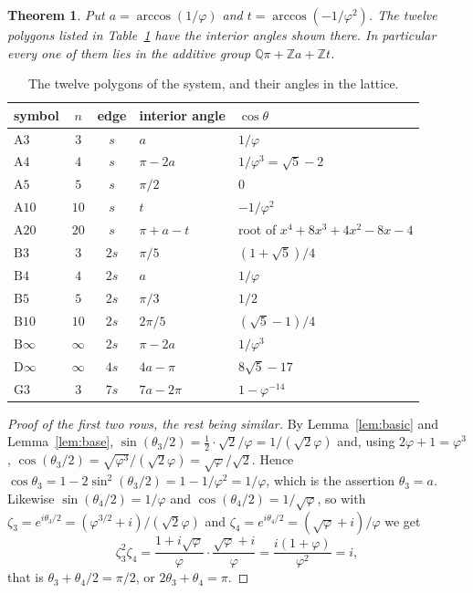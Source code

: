 \documentclass[11pt,a4paper]{article}
\theoremstyle{plain}
\newtheorem{theorem}{Theorem}[section]
\theoremstyle{definition}
\theoremstyle{remark}
\newcommand{\ZZ}{\mathbb{Z}}
\newcommand{\QQ}{\mathbb{Q}}
\begin{document}
\begin{theorem}\label{thm:lattice}
Put $a=\arccos(1/\varphi)$ and $t=\arccos(-1/\varphi^{2})$. The twelve polygons
listed in Table~\ref{tab:poly} have the interior angles shown there. In
particular every one of them lies in the additive group
$\QQ\pi+\ZZ a+\ZZ t$.
\end{theorem}

\begin{table}[t]
\centering
\begin{tabular}{@{}lccll@{}}
\toprule
symbol & $n$ & edge & interior angle & $\cos\theta$\\
\midrule
$\mathrm{A}3$   & $3$      & $s$  & $a$            & $1/\varphi$\\
$\mathrm{A}4$   & $4$      & $s$  & $\pi-2a$       & $1/\varphi^{3}=\sqrt5-2$\\
$\mathrm{A}5$   & $5$      & $s$  & $\pi/2$        & $0$\\
$\mathrm{A}10$  & $10$     & $s$  & $t$            & $-1/\varphi^{2}$\\
$\mathrm{A}20$  & $20$     & $s$  & $\pi+a-t$      & root of $x^{4}+8x^{3}+4x^{2}-8x-4$\\
$\mathrm{B}3$   & $3$      & $2s$ & $\pi/5$        & $(1+\sqrt5)/4$\\
$\mathrm{B}4$   & $4$      & $2s$ & $a$            & $1/\varphi$\\
$\mathrm{B}5$   & $5$      & $2s$ & $\pi/3$        & $1/2$\\
$\mathrm{B}10$  & $10$     & $2s$ & $2\pi/5$       & $(\sqrt5-1)/4$\\
$\mathrm{B}\infty$ & $\infty$ & $2s$ & $\pi-2a$    & $1/\varphi^{3}$\\
$\mathrm{D}\infty$ & $\infty$ & $4s$ & $4a-\pi$    & $8\sqrt5-17$\\
$\mathrm{G}3$   & $3$      & $7s$ & $7a-2\pi$      & $1-\varphi^{-14}$\\
\bottomrule
\end{tabular}
\caption{The twelve polygons of the system, and their angles in the lattice.}
\label{tab:poly}
\end{table}

\begin{proof}[Proof of the first two rows, the rest being similar]
By Lemma~\ref{lem:basic} and Lemma~\ref{lem:base},
$\sin(\theta_3/2)=\tfrac12\cdot\sqrt2/\varphi=1/(\sqrt2\varphi)$ and, using
$2\varphi+1=\varphi^{3}$,
$\cos(\theta_3/2)=\sqrt{\varphi^{3}}/(\sqrt2\varphi)=\sqrt{\varphi}/\sqrt2$.
Hence $\cos\theta_3=1-2\sin^{2}(\theta_3/2)=1-1/\varphi^{2}=1/\varphi$, which is
the assertion $\theta_3=a$. Likewise $\sin(\theta_4/2)=1/\varphi$ and
$\cos(\theta_4/2)=1/\sqrt{\varphi}$, so with
$\zeta_3=e^{i\theta_3/2}=(\varphi^{3/2}+i)/(\sqrt2\varphi)$ and
$\zeta_4=e^{i\theta_4/2}=(\sqrt{\varphi}+i)/\varphi$ we get
\[
  \zeta_3^{2}\zeta_4
  =\frac{1+i\sqrt{\varphi}}{\varphi}\cdot\frac{\sqrt{\varphi}+i}{\varphi}
  =\frac{i(1+\varphi)}{\varphi^{2}}=i ,
\]
that is $\theta_3+\theta_4/2=\pi/2$, or $2\theta_3+\theta_4=\pi$.
\end{proof}
\end{document}
